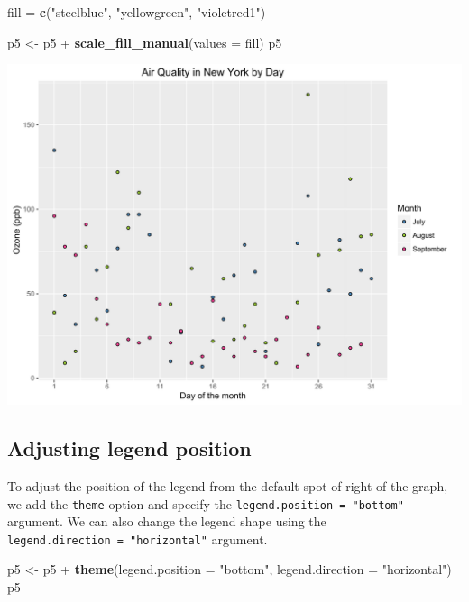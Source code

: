 \documentclass[]{article}
\newenvironment{Shaded}{\begin{snugshade}}{\end{snugshade}}
\newcommand{\KeywordTok}[1]{\textcolor[rgb]{0.13,0.29,0.53}{\textbf{{#1}}}}
\newcommand{\DataTypeTok}[1]{\textcolor[rgb]{0.13,0.29,0.53}{{#1}}}
\newcommand{\StringTok}[1]{\textcolor[rgb]{0.31,0.60,0.02}{{#1}}}
\newcommand{\NormalTok}[1]{{#1}}
\begin{document}
\begin{Shaded}
\begin{Highlighting}[]
\NormalTok{fill =}\StringTok{ }\KeywordTok{c}\NormalTok{(}\StringTok{"steelblue"}\NormalTok{, }\StringTok{"yellowgreen"}\NormalTok{, }\StringTok{"violetred1"}\NormalTok{)}

\NormalTok{p5 <-}\StringTok{ }\NormalTok{p5 +}\StringTok{ }\KeywordTok{scale_fill_manual}\NormalTok{(}\DataTypeTok{values =} \NormalTok{fill)}
\NormalTok{p5}
\end{Highlighting}
\end{Shaded}

\begin{center}\includegraphics{0_all_posts_pdf/scatter_10-1} \end{center}

\subsection{Adjusting legend
position}\label{adjusting-legend-position-3}

To adjust the position of the legend from the default spot of right of
the graph, we add the \texttt{theme} option and specify the
\texttt{legend.position\ =\ "bottom"} argument. We can also change the
legend shape using the \texttt{legend.direction\ =\ "horizontal"}
argument.

\begin{Shaded}
\begin{Highlighting}[]
\NormalTok{p5 <-}\StringTok{ }\NormalTok{p5 +}\StringTok{ }\KeywordTok{theme}\NormalTok{(}\DataTypeTok{legend.position =} \StringTok{"bottom"}\NormalTok{, }\DataTypeTok{legend.direction =} \StringTok{"horizontal"}\NormalTok{)}
\NormalTok{p5}
\end{Highlighting}
\end{Shaded}
\end{document}
